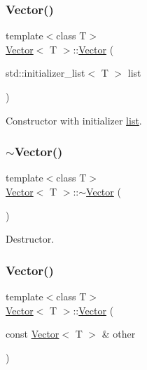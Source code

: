 \subsubsection{\texorpdfstring{Vector()}{Vector()}\hspace{0.1cm}{\footnotesize\ttfamily [3/10]}}
{\footnotesize\ttfamily template$<$class T$>$ \\
\hyperlink{classVector}{Vector}$<$ T $>$\+::\hyperlink{classVector}{Vector} (\begin{DoxyParamCaption}\item[{std\+::initializer\+\_\+list$<$ T $>$}]{list }\end{DoxyParamCaption})\hspace{0.3cm}{\ttfamily [inline]}}

Constructor with initializer \hyperlink{protocollist-p}{list}. \mbox{\label{classVector_afd524fac19e6d3d69db5198ffe2952b0}} 
\subsubsection{\texorpdfstring{$\sim$\+Vector()}{~Vector()}\hspace{0.1cm}{\footnotesize\ttfamily [1/2]}}
{\footnotesize\ttfamily template$<$class T$>$ \\
\hyperlink{classVector}{Vector}$<$ T $>$\+::$\sim$\hyperlink{classVector}{Vector} (\begin{DoxyParamCaption}{ }\end{DoxyParamCaption})\hspace{0.3cm}{\ttfamily [inline]}}

Destructor. \mbox{\label{classVector_ad0ed347210040680329535d7e4d16ae1}} 
\subsubsection{\texorpdfstring{Vector()}{Vector()}\hspace{0.1cm}{\footnotesize\ttfamily [4/10]}}
{\footnotesize\ttfamily template$<$class T$>$ \\
\hyperlink{classVector}{Vector}$<$ T $>$\+::\hyperlink{classVector}{Vector} (\begin{DoxyParamCaption}\item[{const \hyperlink{classVector}{Vector}$<$ T $>$ \&}]{other }\end{DoxyParamCaption})\hspace{0.3cm}{\ttfamily [inline]}}

